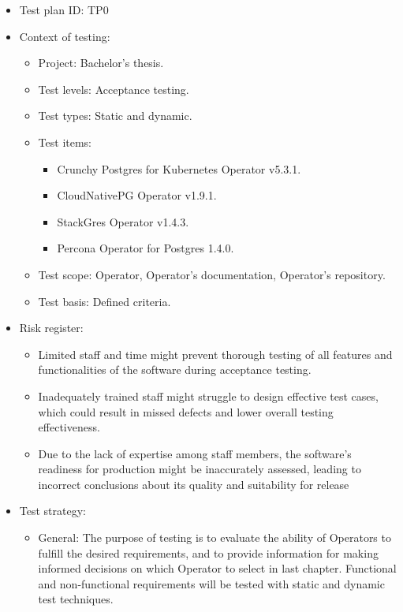 \begin{itemize}
  \item Test plan ID: TP0
  \item Context of testing:
        \begin{itemize}
          \item Project: Bachelor’s thesis.
          \item Test levels: Acceptance testing.
          \item Test types: Static and dynamic.
          \item Test items:
                \begin{itemize}
                  \item Crunchy Postgres for Kubernetes Operator v5.3.1.
                  \item CloudNativePG Operator v1.9.1.
                  \item StackGres Operator v1.4.3.
                  \item Percona Operator for Postgres 1.4.0.
                \end{itemize}
          \item Test scope: Operator, Operator’s documentation, Operator’s repository.
          \item Test basis: Defined criteria.
        \end{itemize}
  \item Risk register:
        \begin{itemize}
          \item Limited staff and time might prevent thorough testing of all features and functionalities of the software during acceptance testing.
          \item Inadequately trained staff might struggle to design effective test cases, which could result in missed defects and lower overall testing effectiveness.
          \item Due to the lack of expertise among staff members, the software's readiness for production might be inaccurately assessed, leading to incorrect conclusions about its quality and suitability for release
        \end{itemize}
  \item Test strategy:
        \begin{itemize}
          \item General: The purpose of testing is to evaluate the ability of Operators to fulfill the desired requirements, and to provide information for making informed decisions on which Operator to select in last chapter. Functional and non-functional requirements will be tested with static and dynamic test techniques.

\end{itemize}
\end{itemize}
